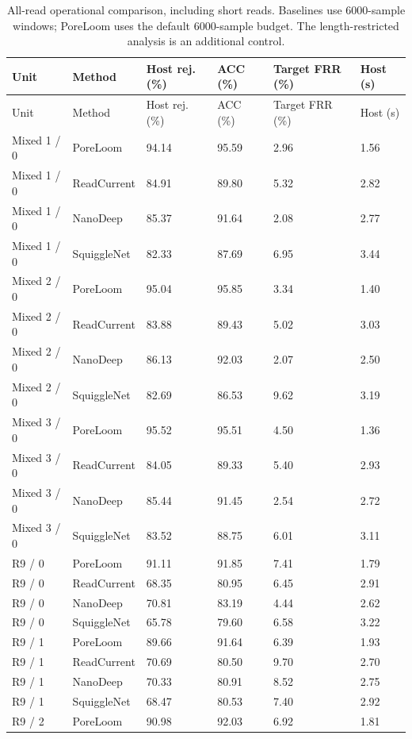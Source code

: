 \begin{longtable}{llllll}
\caption{All-read operational comparison, including short reads. Baselines use 6000-sample windows; PoreLoom uses the default 6000-sample budget. The length-restricted analysis is an additional control.}\label{tab:s_main}\\
\toprule
Unit & Method & Host rej. (\%) & ACC (\%) & Target FRR (\%) & Host (s)\\\midrule\endfirsthead
\toprule
Unit & Method & Host rej. (\%) & ACC (\%) & Target FRR (\%) & Host (s)\\\midrule\endhead
\bottomrule\endfoot
Mixed 1 / 0 & PoreLoom & 94.14 & 95.59 & 2.96 & 1.56\\
Mixed 1 / 0 & ReadCurrent & 84.91 & 89.80 & 5.32 & 2.82\\
Mixed 1 / 0 & NanoDeep & 85.37 & 91.64 & 2.08 & 2.77\\
Mixed 1 / 0 & SquiggleNet & 82.33 & 87.69 & 6.95 & 3.44\\
Mixed 2 / 0 & PoreLoom & 95.04 & 95.85 & 3.34 & 1.40\\
Mixed 2 / 0 & ReadCurrent & 83.88 & 89.43 & 5.02 & 3.03\\
Mixed 2 / 0 & NanoDeep & 86.13 & 92.03 & 2.07 & 2.50\\
Mixed 2 / 0 & SquiggleNet & 82.69 & 86.53 & 9.62 & 3.19\\
Mixed 3 / 0 & PoreLoom & 95.52 & 95.51 & 4.50 & 1.36\\
Mixed 3 / 0 & ReadCurrent & 84.05 & 89.33 & 5.40 & 2.93\\
Mixed 3 / 0 & NanoDeep & 85.44 & 91.45 & 2.54 & 2.72\\
Mixed 3 / 0 & SquiggleNet & 83.52 & 88.75 & 6.01 & 3.11\\
R9 / 0 & PoreLoom & 91.11 & 91.85 & 7.41 & 1.79\\
R9 / 0 & ReadCurrent & 68.35 & 80.95 & 6.45 & 2.91\\
R9 / 0 & NanoDeep & 70.81 & 83.19 & 4.44 & 2.62\\
R9 / 0 & SquiggleNet & 65.78 & 79.60 & 6.58 & 3.22\\
R9 / 1 & PoreLoom & 89.66 & 91.64 & 6.39 & 1.93\\
R9 / 1 & ReadCurrent & 70.69 & 80.50 & 9.70 & 2.70\\
R9 / 1 & NanoDeep & 70.33 & 80.91 & 8.52 & 2.75\\
R9 / 1 & SquiggleNet & 68.47 & 80.53 & 7.40 & 2.92\\
R9 / 2 & PoreLoom & 90.98 & 92.03 & 6.92 & 1.81\\

\end{longtable}
